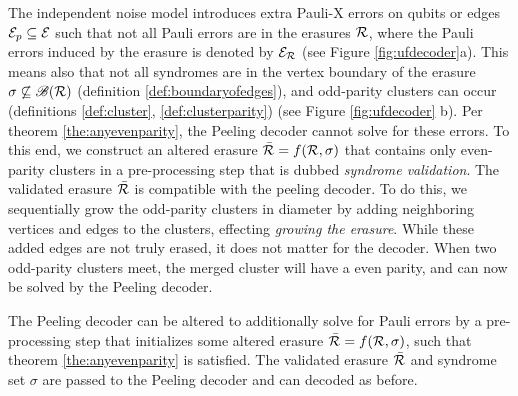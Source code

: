The independent noise model introduces extra Pauli-X errors on qubits or edges $\mathcal{E}_p\subseteq \mathcal{E}$ such that not all Pauli errors are in the erasures $\mathcal{R}$, where the Pauli errors induced by the erasure is denoted by $\mathcal{E}_{\mathcal{R}}$ (see Figure \ref{fig:ufdecoder}a). This means also that not all syndromes are in the vertex boundary of the erasure $\sigma \not\subseteq \mathscr{B}(\mathcal{R})$ (definition \ref{def:boundaryofedges}), and odd-parity clusters can occur (definitions \ref{def:cluster}, \ref{def:clusterparity}) (see Figure \ref{fig:ufdecoder} b). Per theorem \ref{the:anyevenparity}, the Peeling decoder cannot solve for these errors. To this end, we construct an altered erasure $\bar{\mathcal{R}} = f(\mathcal{R},\sigma)$ that contains only even-parity clusters in a pre-processing step that is dubbed \emph{syndrome validation}. The validated erasure $\bar{\mathcal{R}}$ is compatible with the peeling decoder. To do this, we sequentially grow the odd-parity clusters in diameter by adding neighboring vertices and edges to the clusters, effecting \emph{growing the erasure}. While these added edges are not truly erased, it does not matter for the decoder. When two odd-parity clusters meet, the merged cluster will have a even parity, and can now be solved by the Peeling decoder.
\begin{proposition}
  The Peeling decoder can be altered to additionally solve for Pauli errors by a pre-processing step that initializes some altered erasure $\bar{\mathcal{R}}=f(\mathcal{R},\sigma)$, such that theorem \ref{the:anyevenparity} is satisfied. The validated erasure $\bar{\mathcal{R}}$ and syndrome set $\sigma$ are passed to the Peeling decoder and can decoded as before.
\end{proposition}
